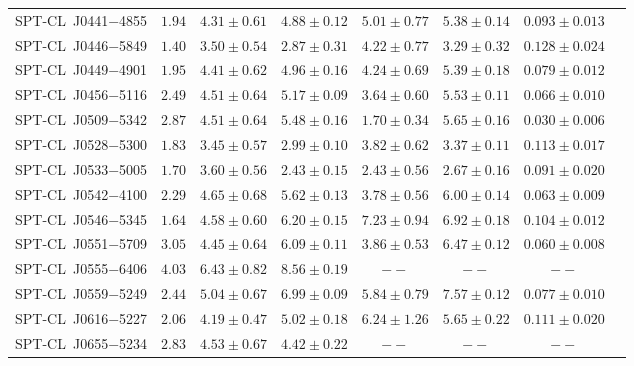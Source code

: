 \begin{table}
{\begin{tabular}{lccccccc}
    SPT-CL~J0441$-$4855    &$ 1.94 $    &$ 4.31 \pm 0.61 $    &$ 4.88 \pm 0.12 $    &$ 5.01 \pm 0.77 $     &$ 5.38 \pm 0.14 $    &$ 0.093 \pm 0.013 $    \\ 
    SPT-CL~J0446$-$5849    &$ 1.40 $    &$ 3.50 \pm 0.54 $    &$ 2.87 \pm 0.31 $    &$ 4.22 \pm 0.77 $     &$ 3.29 \pm 0.32 $    &$ 0.128 \pm 0.024 $    \\ 
    SPT-CL~J0449$-$4901    &$ 1.95 $    &$ 4.41 \pm 0.62 $    &$ 4.96 \pm 0.16 $    &$ 4.24 \pm 0.69 $     &$ 5.39 \pm 0.18 $    &$ 0.079 \pm 0.012 $    \\ 
    SPT-CL~J0456$-$5116    &$ 2.49 $    &$ 4.51 \pm 0.64 $    &$ 5.17 \pm 0.09 $    &$ 3.64 \pm 0.60 $     &$ 5.53 \pm 0.11 $    &$ 0.066 \pm 0.010 $    \\ 
    SPT-CL~J0509$-$5342    &$ 2.87 $    &$ 4.51 \pm 0.64 $    &$ 5.48 \pm 0.16 $    &$ 1.70 \pm 0.34 $     &$ 5.65 \pm 0.16 $    &$ 0.030 \pm 0.006 $    \\ 
    SPT-CL~J0528$-$5300    &$ 1.83 $    &$ 3.45 \pm 0.57 $    &$ 2.99 \pm 0.10 $    &$ 3.82 \pm 0.62 $     &$ 3.37 \pm 0.11 $    &$ 0.113 \pm 0.017 $    \\ 
    SPT-CL~J0533$-$5005    &$ 1.70 $    &$ 3.60 \pm 0.56 $    &$ 2.43 \pm 0.15 $    &$ 2.43 \pm 0.56 $     &$ 2.67 \pm 0.16 $    &$ 0.091 \pm 0.020 $    \\ 
    SPT-CL~J0542$-$4100    &$ 2.29 $    &$ 4.65 \pm 0.68 $    &$ 5.62 \pm 0.13 $    &$ 3.78 \pm 0.56 $     &$ 6.00 \pm 0.14 $    &$ 0.063 \pm 0.009 $    \\ 
    SPT-CL~J0546$-$5345    &$ 1.64 $    &$ 4.58 \pm 0.60 $    &$ 6.20 \pm 0.15 $    &$ 7.23 \pm 0.94 $     &$ 6.92 \pm 0.18 $    &$ 0.104 \pm 0.012 $    \\ 
    SPT-CL~J0551$-$5709    &$ 3.05 $    &$ 4.45 \pm 0.64 $    &$ 6.09 \pm 0.11 $    &$ 3.86 \pm 0.53 $     &$ 6.47 \pm 0.12 $    &$ 0.060 \pm 0.008 $    \\ 
    SPT-CL~J0555$-$6406    &$ 4.03 $    &$ 6.43 \pm 0.82 $    &$ 8.56 \pm 0.19 $    &$       --      $     &$       --      $    &$       --      $    \\ 
    SPT-CL~J0559$-$5249    &$ 2.44 $    &$ 5.04 \pm 0.67 $    &$ 6.99 \pm 0.09 $    &$ 5.84 \pm 0.79 $     &$ 7.57 \pm 0.12 $    &$ 0.077 \pm 0.010 $    \\ 
    SPT-CL~J0616$-$5227    &$ 2.06 $    &$ 4.19 \pm 0.47 $    &$ 5.02 \pm 0.18 $    &$ 6.24 \pm 1.26 $     &$ 5.65 \pm 0.22 $    &$ 0.111 \pm 0.020 $    \\ 
    SPT-CL~J0655$-$5234    &$ 2.83 $    &$ 4.53 \pm 0.67 $    &$ 4.42 \pm 0.22 $    &$       --      $     &$       --      $    &$       --      $    \\ 

\end{tabular}}
\end{table}
